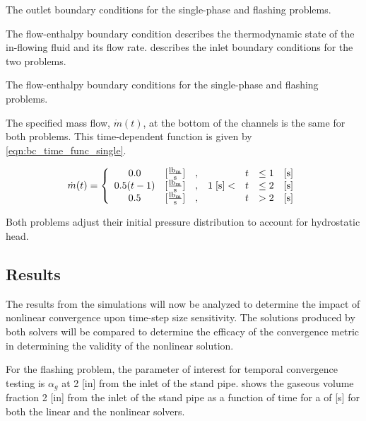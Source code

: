 \begin{table}[h!tb]
\centering
\singlespace

\caption{The outlet boundary conditions for the single-phase and flashing problems.}
\label{tab:dualOutlet}
\end{table}

The flow-enthalpy boundary condition describes the thermodynamic state of the in-flowing fluid and its flow rate.
 describes the inlet boundary conditions for the two problems.

\begin{table}[h!tb]
\centering
\singlespace

\caption{The flow-enthalpy boundary conditions for the single-phase and flashing problems.}
\label{tab:dualInlet}
\end{table}

The specified mass flow, $\dot{m}(t)$, at the bottom of the channels is the same for both problems. 
This time-dependent function is given by \eqref{eqn:bc_time_func_single}.

\begin{equation}
\label{eqn:bc_time_func_single}
\dot{m}(t) = \left\{
\begin{array}{cclrcll}
 0.0           & [\frac{ \lbm{} }{\text{s}}] & , &                & t & \leq 1 & [\text{s}] \\
 0.5 ( t - 1)  & [\frac{ \lbm{} }{\text{s}}] & , & 1\; [\text{s}] < & t & \leq 2 & [\text{s}] \\
 0.5           & [\frac{ \lbm{} }{\text{s}}] & , &                & t & > 2    & [\text{s}]
\end{array}\right.
\end{equation}

Both problems adjust their initial pressure distribution to account for hydrostatic head.

\subsection{Results}
\label{subsect:single_results}

The results from the simulations will now be analyzed to determine the impact of nonlinear convergence upon time-step size sensitivity.
The solutions produced by both solvers will be compared to determine the efficacy of the convergence metric in determining the validity of the nonlinear solution.

For the flashing problem, the parameter of interest for temporal convergence testing is $\alpha_g$ at 2 [in] from the inlet of the stand pipe.
 shows the gaseous volume fraction 2 [in] from the inlet of the stand pipe as a function of time for a \dtmax{} of  [s] for both the linear and the nonlinear solvers.

